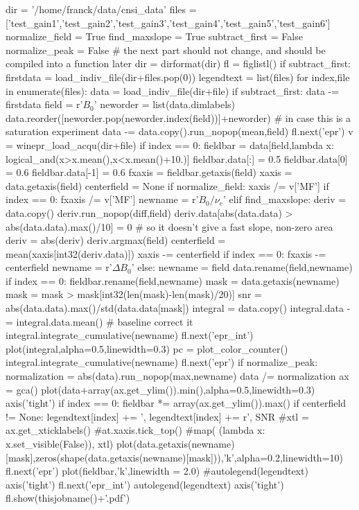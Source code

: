 \begin{tiny}
\begin{python}
dir = '/home/franck/data/cnsi_data'
files = ['test_gain1','test_gain2','test_gain3','test_gain4','test_gain5','test_gain6']
normalize_field = True
find_maxslope = True
subtract_first = False
normalize_peak = False
# the next part should not change, and should be compiled into a function later
dir = dirformat(dir)
fl = figlistl()
if subtract_first:
    firstdata = load_indiv_file(dir+files.pop(0))
legendtext = list(files)
for index,file in enumerate(files):
   data = load_indiv_file(dir+file)
   if subtract_first:
       data -= firstdata
   field = r'$B_0$'
   neworder = list(data.dimlabels)
   data.reorder([neworder.pop(neworder.index(field))]+neworder) # in case this is a saturation experiment
   data -= data.copy().run_nopop(mean,field)
   fl.next('epr')
   v = winepr_load_acqu(dir+file)
   if index == 0:
        fieldbar = data[field,lambda x: logical_and(x>x.mean(),x<x.mean()+10.)]
        fieldbar.data[:] = 0.5
        fieldbar.data[0] = 0.6
        fieldbar.data[-1] = 0.6
        fxaxis = fieldbar.getaxis(field)
   xaxis = data.getaxis(field)
   centerfield = None
   if normalize_field:
       xaxis /= v['MF']
       if index == 0:
           fxaxis /= v['MF']
       newname = r'$B_0/\nu_e$'
   elif find_maxslope:
       deriv = data.copy()
       deriv.run_nopop(diff,field)
       deriv.data[abs(data.data) > abs(data.data).max()/10] = 0 # so it doesn't give a fast slope, non-zero area
       deriv = abs(deriv)
       deriv.argmax(field)
       centerfield = mean(xaxis[int32(deriv.data)])
       xaxis -= centerfield
       if index == 0:
           fxaxis -= centerfield
       newname = r'$\Delta B_0$'
   else:
       newname = field
   data.rename(field,newname)
   if index == 0:
       fieldbar.rename(field,newname)
   mask = data.getaxis(newname)
   mask = mask > mask[int32(len(mask)-len(mask)/20)]
   snr = abs(data.data).max()/std(data.data[mask])
   integral = data.copy()
   integral.data -= integral.data.mean() # baseline correct it
   integral.integrate_cumulative(newname)
   fl.next('epr_int')
   plot(integral,alpha=0.5,linewidth=0.3)
   pc = plot_color_counter()
   integral.integrate_cumulative(newname)
   fl.next('epr')
   if normalize_peak:
      normalization = abs(data).run_nopop(max,newname)
      data /= normalization
   ax = gca()
   plot(data+array(ax.get_ylim()).min(),alpha=0.5,linewidth=0.3)
   axis('tight')
   if index == 0:
       fieldbar *= array(ax.get_ylim()).max()
   if centerfield != None:
      legendtext[index] += ', %
   legendtext[index] += r', SNR %
#xtl = ax.get_xticklabels()
#at.xaxis.tick_top()
#map( (lambda x: x.set_visible(False)), xtl)
plot(data.getaxis(newname)[mask],zeros(shape(data.getaxis(newname)[mask])),'k',alpha=0.2,linewidth=10)
fl.next('epr')
plot(fieldbar,'k',linewidth = 2.0)
#autolegend(legendtext)
axis('tight')
fl.next('epr_int')
autolegend(legendtext)
axis('tight')
fl.show(thisjobname()+'.pdf')
\end{python}
\end{tiny}




